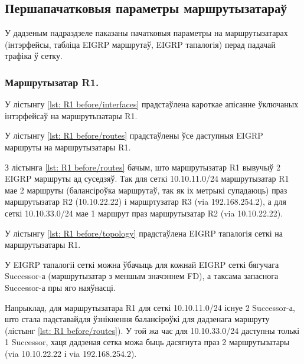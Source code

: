 \subsection{Першапачатковыя параметры маршрутызатараў}

У дадзеным падраздзеле паказаны пачатковыя параметры на маршрутызатарах (інтэрфейсы, табліца EIGRP маршрутаў, EIGRP тапалогія)
перад падачай трафіка ў сетку.

\subsubsection{Маршрутызатар R1.}

У лістынгу \ref{lst: R1 before/interfaces} прадстаўлена кароткае апісанне ўключаных інтэрфейсаў на маршрутызатары R1.



У лістынгу \ref{lst: R1 before/routes} прадстаўлены ўсе даступныя EIGRP маршруты на маршрутызатары R1.




З лістынга \ref{lst: R1 before/routes} бачым, што маршрутызатар R1
вывучыў 2 EIGRP маршруты ад суседзяў.
Так для сеткі 10.10.11.0/24 маршрутызатар R1 мае 2 маршруты (балансіроўка
маршрутаў, так як іх метрыкі супадаюць)
праз маршрутызатар R2 (10.10.22.22) і маршртузатар R3 (via 192.168.254.2),
а для сеткі 10.10.33.0/24 мае 1 маршрут праз маршрутызатар R2 (via 10.10.22.22).

У лістынгу \ref{lst: R1 before/topology} прадстаўлена EIGRP тапалогія сеткі на
маршрутызатары R1.



У EIGRP тапалогіі сеткі можна ўбачыць для кожнай EIGRP сеткі бягучага
Successor-а (маршрутызатар з меншым значэннем FD), а таксама запаснога
Successor-а пры яго наяўнасці.

Напрыклад, для маршрутызатара R1 для сеткі 10.10.11.0/24 існуе 2 Successor-а,
што стала падставайдля ўзнікнення балансіроўкі для дадзенага маршруту
(лістынг \ref{lst: R1 before/routes}).
У той жа час для 10.10.33.0/24 даступны толькі 1 Successor, хаця дадзеная
сетка можа быць дасягнута праз 2 маршрутызатары (via 10.10.22.22 і via 192.168.254.2).

